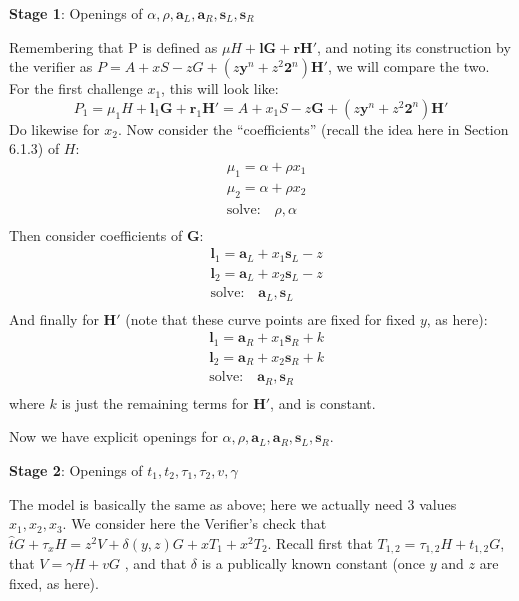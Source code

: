 \documentclass[10pt,a4paper]{article}
\begin{document}
\textbf{Stage 1}: Openings of $\alpha, \rho, \textbf{a}_L, \textbf{a}_R, \textbf{s}_L, \textbf{s}_R$

Remembering that P is defined as $\mu H + \textbf{lG} + \textbf{rH}'$, and noting its construction by the
verifier as $P = A + xS -zG + \left(z\textbf{y}^n + z^2\textbf{2}^n\right)\textbf{H}'$, we will compare the two. For the first challenge $x_1$, this
will look like:
\[P_1 = \mu_1 H + \textbf{l}_1\textbf{G} + \textbf{r}_1\textbf{H}' = A + x_1S -z\textbf{G} + (z\textbf{y}^n+z^2\textbf{2}^n)\textbf{H}'\]
Do likewise for $x_2$. Now consider the ``coefficients'' (recall the idea
here in Section 6.1.3) of $H$:
\begin{align*}
& \mu_1 = \alpha + \rho x_1 \\
& \mu_2 = \alpha + \rho x_2 \\
& \textrm{solve:}\quad \rho, \alpha \\
\end{align*}
Then consider coefficients of $\mathbf{G}$:
\begin{align*}
& \textbf{l}_1 = \textbf{a}_L + x_1\textbf{s}_L - z \\
& \textbf{l}_2 = \textbf{a}_L + x_2\textbf{s}_L - z \\
&\textrm{solve:}\quad \textbf{a}_L, \textbf{s}_L \\
\end{align*}
And finally for $\mathbf{H}'$ (note that these curve points are fixed for fixed $y$, as
here):
\begin{align*}
& \textbf{l}_1 = \textbf{a}_R + x_1\textbf{s}_R +k \\
& \textbf{l}_2 = \textbf{a}_R + x_2\textbf{s}_R +k \\
&\textrm{solve:}\quad \textbf{a}_R, \textbf{s}_R \\
\end{align*}
where $k$ is just the remaining terms for $\mathbf{H}'$, and is constant.

Now we have explicit openings for $\alpha, \rho, \textbf{a}_L, \textbf{a}_R, \textbf{s}_L, \textbf{s}_R$.

\textbf{Stage 2}: Openings of $t_1, t_2, \tau_1, \tau_2, v, \gamma$

The model is basically the same as above; here we actually need 3 values $x_1, x_2, x_3$. We consider here the Verifier's check that $\hat{t} G + \tau_x H = z^2V + \delta(y, z)G + xT_1 + x^2T_2$. Recall first that $T_{1,2} =\tau_{1,2} H + t_{1,2} G$, that $V = \gamma H + v G$
, and that $\delta$ is a publically known constant (once $y$ and $z$ are fixed, as here).
\end{document}
